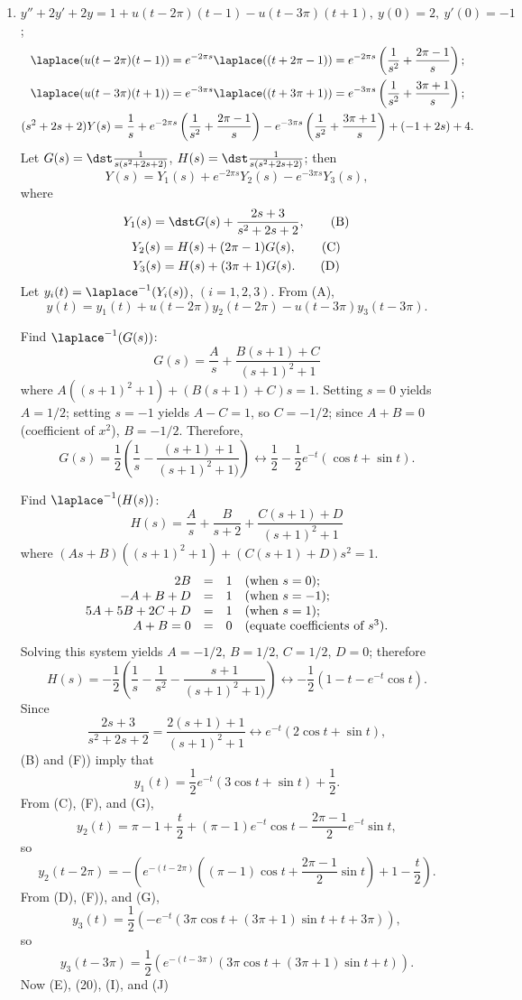 \documentclass[openany]{book}
\newenvironment{sectionSolutions}{
 \begin{enumerate}[item-label={\thesection.\arabic{enumi}.}]
}{
 \end{enumerate}
}
\begin{document}
\begin{sectionSolutions}
\item
$y''+2y'+2y=1+u(t-2\pi)(t-1)-u(t-3\pi)(t+1),\ y(0)=2,\ y'(0)=-1$;
\begin{gather*}
\laplace (u(t-2\pi)(t-1))=e^{-2\pi s}\laplace ((t+2\pi-1))
=e^{-2\pi s}\left(\frac{1}{ s^2}+\frac{2\pi-1}{ s}\right);
\\
\laplace (u(t-3\pi)(t+1))=e^{-3\pi s}\laplace ((t+3\pi+1))
=e^{-3\pi s}\left(\frac{1}{ s^2}+\frac{3\pi+1}{ s}\right);
\\
(s^2+2s+2)Y(s)=\frac{1}{ s}+
e^{-2\pi s}\left(\frac{1}{ s^2}+\frac{2\pi-1}{ s}\right)
-e^{-3\pi s}\left(\frac{1}{ s^2}+\frac{3\pi+1}{ s}\right)+(-1+2s)+4.
\end{gather*}
Let $G(s)=\dst\frac{1}{ s(s^2+2s+2)}$,
 $H(s)=\dst\frac{1}{ s(s^2+2s+2)}$; then
\[
Y(s)=Y_1(s)+e^{-2\pi s}Y_2(s)-e^{-3\pi s}Y_3(s),\tag{A}
\]
where
\begin{gather*}
Y_1(s)=\dst G(s)+\frac{2s+3}{ s^2+2s+2},\tag{B}\\
Y_2(s)=H(s)+(2\pi-1)G(s),\tag{C}\\
Y_3(s)=H(s)+(3\pi+1)G(s). \tag{D}
\end{gather*}
Let $y_i(t)=\laplace ^{-1}(Y_i(s))$, $(i=1,2,3)$. From (A),
\[
y(t)=y_1(t)+u(t-2\pi)y_2(t-2\pi)-u(t-3\pi)y_3(t-3\pi).\tag{E}
\]

Find $\laplace ^{-1}(G(s))$:
\[
G(s)=\frac{A}{ s}+\frac{B(s+1)+C}{(s+1)^2+1}
\]
where
$A((s+1)^2+1)+(B(s+1)+C)s=1$. Setting $s=0$ yields $A=1/2$;
setting $s=-1$ yields $A-C=1$, so $C=-1/2$; since $A+B=0$
(coefficient of $x^2$), $B=-1/2$. Therefore,
\[
G(s)=\frac{1}{2}\left(\frac{1}{ s}-\frac{(s+1)+1}{(s+1)^2+1)}\right)
\leftrightarrow \frac{1}{2}-\frac{1}{2}e^{-t}(\cos t+\sin t).
\tag{F}
\]


Find $\laplace ^{-1}(H(s))$:
\[
H(s)=\frac{A}{ s}+\frac{B}{ s+2}+\frac{C(s+1)+D}{(s+1)^2+1}
\]
where
$(As+B)((s+1)^2+1)+(C(s+1)+D)s^2=1$.
\[
\begin{array}{rc rl}
2B&=&1&(\text{when }s=0);\\
-A+B+D&=&1& (\text{when }s=-1);\\
5A+5B+2C+D&=&1& (\text{when }s=1);\\
A+B=0&=&0&(\text{equate coefficients of }s^3).
\end{array}
\]
Solving this system yields  $A=-1/2$, $B=1/2$, $C=1/2$, $D=0$;
therefore
\[
H(s)=-\frac{1}{2}\left(\frac{1}{
s}-\frac{1}{ s^2}-\frac{s+1}{(s+1)^2+1)}\right)
\leftrightarrow -\frac{1}{2}(1-t-e^{-t}\cos t). \tag{G}
\]
Since
\[
\frac{2s+3}{ s^2+2s+2}=\frac{2(s+1)+1}{(s+1)^2+1}
\leftrightarrow e^{-t}(2\cos t+\sin t),
\]
(B) and (F)) imply that
\[
y_1(t)=\frac{1}{2}e^{-t}(3\cos t+\sin t)+\frac{1}{2}.
\tag{H}
\]
From (C), (F), and (G),
\[
y_2(t)=\pi-1+\frac{t}{2}+(\pi-1) e^{-t}\cos t-\frac{2\pi-1}{2}e^{-t}\sin
t,
\]
so
\[
y_2(t-2\pi)=-\left(
e^{-(t-2\pi)}\left((\pi-1)\cos t+\frac{2\pi-1}{2}\sin t\right)+
1-\frac{t}{2}\right). \tag{I}
\]
From (D), (F)), and (G),
\[
y_3(t)=\frac{1}{2}\left(-e^{-t}(3\pi\cos t+(3\pi+1)\sin
t+t+3\pi)\right),
\]
so
\[
y_3(t-3\pi)=\frac{1}{2}\left(e^{-(t-3\pi)}(3\pi\cos t+(3\pi+1)\sin
t+t)\right).  \tag{J}
\]
Now (E), (20), (I), and
(J)


\end{sectionSolutions}
\end{document}
